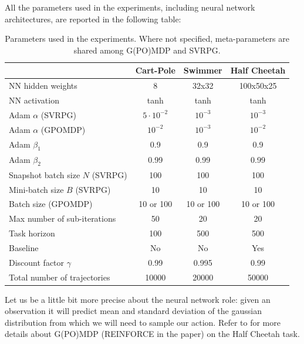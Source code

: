 All the parameters used in the experiments, including neural network architectures, are reported in the following table:

\begin{table}[H]\caption{Parameters used in the experiments. Where not specified, meta-parameters are shared among G(PO)MDP and SVRPG.}\label{table:metaparams}
	\centering
	\begin{tabular}{| l | c  c  c |}
		\hline	
		& Cart-Pole & Swimmer & Half Cheetah \\
		\hline
		NN hidden weights & 8 & 32x32 & 100x50x25 \\
		NN activation & tanh & tanh & tanh \\
		Adam $\alpha$ (SVRPG) & $5\cdotp10^{-2}$ & $10^{-3}$ & $10^{-3}$ \\
		Adam $\alpha$ (GPOMDP) & $10^{-2}$ & $10^{-3}$ & $10^{-2}$ \\
		Adam $\beta_1$ & 0.9 & 0.9 & 0.9 \\
		Adam $\beta_2$ & 0.99 & 0.99 & 0.99 \\ 
		Snapshot batch size $N$ (SVRPG) & 100 & 100 & 100 \\
		Mini-batch size $B$ (SVRPG) & 10 & 10 & 10 \\
		Batch size (GPOMDP) & 10 or 100 & 10 or 100 & 10 or 100\\
		Max number of sub-iterations & 50 & 20 & 20 \\
		Task horizon& 100 & 500 & 500 \\
		Baseline& No & No & Yes \\
		Discount factor $\gamma$& 0.99 & 0.995 & 0.99 \\
		Total number of trajectories& 10000 & 20000 & 50000 \\
		\hline  
	\end{tabular}
\end{table}
Let us be a little bit more precise about the neural network role: given an observation it will predict mean and standard deviation of the gaussian distribution from which we will need to sample our action. Refer to \cite{duan2016benchmarking} for more details about G(PO)MDP (REINFORCE in the paper) on the Half Cheetah task.



